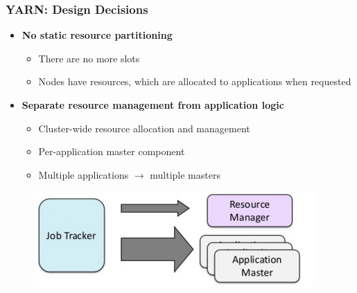 \begin{frame}
\frametitle{YARN: Design Decisions}
\begin{itemize}
  \item {\bf No static resource partitioning}
  \begin{itemize}
    \item There are no more slots
    \item Nodes have resources, which are allocated to applications when requested
  \end{itemize}
  \item {\bf Separate resource management from application logic}
  \begin{itemize}
    \item Cluster-wide resource allocation and management
    \item Per-application master component
    \item Multiple applications $\to$ multiple masters
  \end{itemize}
\end{itemize}
\begin{figure}[h]
  \centering
  \includegraphics[scale=0.5]{./figures/yarn_key_idea}
  \label{fig:yarn_key_idea}
\end{figure}
\end{frame}

